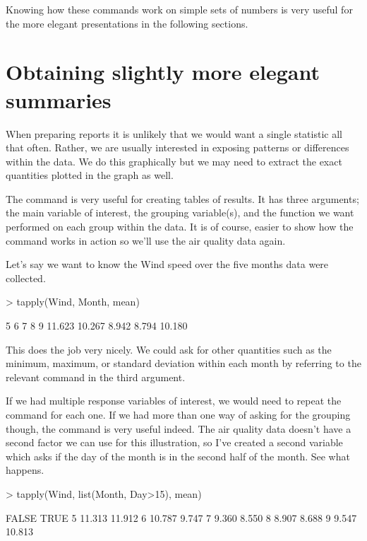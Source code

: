 Knowing how these commands work on simple sets of numbers is very useful for the more elegant presentations in the following sections.

\section{Obtaining slightly more elegant summaries}

When preparing reports it is unlikely that we would want a single statistic all that often. Rather, we are usually interested in exposing patterns or differences within the data. We do this graphically but we may need to extract the exact quantities plotted in the graph as well.

The  command is very useful for creating tables of results. It has three arguments; the main variable of interest, the grouping variable(s), and the function we want performed on each group within the data. It is of course, easier to show how the  command works in action so we'll use the air quality data again.

Let's say we want to know the  Wind speed over the five months data were collected.
\begin{Schunk}
\begin{Sinput}
> tapply(Wind, Month, mean)
\end{Sinput}
\begin{Soutput}
     5      6      7      8      9 
11.623 10.267  8.942  8.794 10.180 
\end{Soutput}
\end{Schunk}
This does the job very nicely. We could ask for other quantities such as the minimum, maximum, or standard deviation within each month by referring to the relevant \R{} command in the third argument.

If we had multiple response variables of interest, we would need to repeat the command for each one. If we had more than one way of asking for the grouping though, the  command is very useful indeed. The air quality data doesn't have a second factor we can use for this illustration, so I've created a second variable which asks if the day of the month is in the second half of the month. See what happens.
\begin{Schunk}
\begin{Sinput}
> tapply(Wind, list(Month, Day>15), mean)
\end{Sinput}
\begin{Soutput}
   FALSE   TRUE
5 11.313 11.912
6 10.787  9.747
7  9.360  8.550
8  8.907  8.688
9  9.547 10.813
\end{Soutput}
\end{Schunk}

